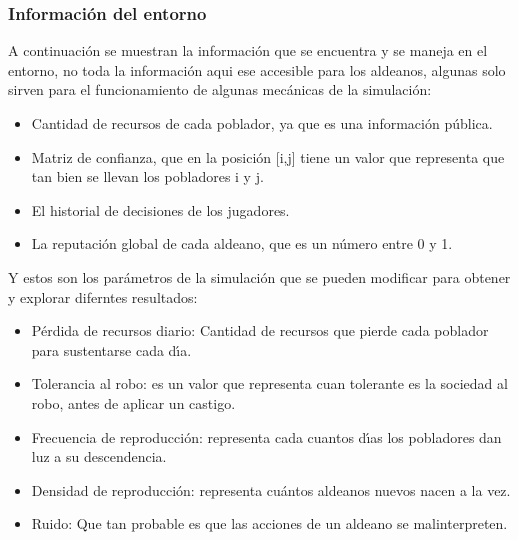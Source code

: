 \documentclass{article}
\begin{document}
\subsubsection{Informaci\'on del entorno}
A continuaci\'on se muestran la informaci\'on que se encuentra y se maneja en el entorno, no toda la informaci\'on aqui ese accesible para los aldeanos, algunas solo sirven
para el funcionamiento de algunas mec\'anicas de la simulaci\'on:
\begin{itemize}
      \item Cantidad de recursos de cada poblador, ya que es una informaci\'on p\'ublica.
      \item Matriz de confianza, que en la posici\'on [i,j] tiene un valor que representa que tan bien se llevan los pobladores i y j.
      \item El historial de decisiones de los jugadores.
      \item La reputaci\'on global de cada aldeano, que es un n\'umero entre 0 y 1.

\end{itemize}

Y estos son los par\'ametros de la simulaci\'on que se pueden modificar para obtener y explorar diferntes resultados:
\begin{itemize}
      \item P\'erdida de recursos diario: Cantidad de recursos que pierde cada poblador para sustentarse cada d\'{\i}a.
      \item Tolerancia al robo: es un valor que representa cuan tolerante es la sociedad al robo, antes de aplicar un castigo.
      \item Frecuencia de reproducci\'on: representa cada cuantos d\'{\i}as los pobladores dan luz a su descendencia.
      \item Densidad de reproducci\'on: representa cu\'antos aldeanos nuevos nacen a la vez.
      \item Ruido: Que tan probable es que las acciones de un aldeano se malinterpreten.
\end{itemize}
\end{document}

